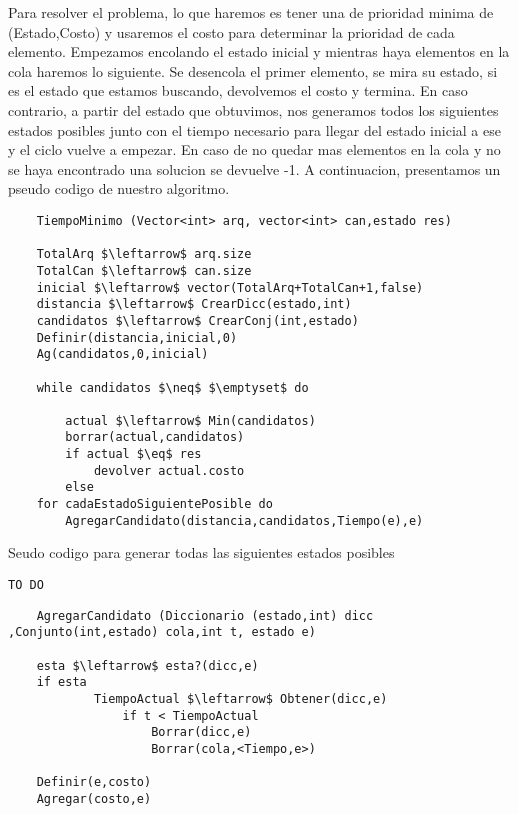 	Para resolver el problema, lo que haremos es tener una de prioridad minima de  (Estado,Costo) y usaremos el costo para determinar la prioridad de cada elemento.
	Empezamos encolando el estado inicial y mientras haya elementos en la cola haremos lo siguiente.
	Se desencola el primer elemento, se mira su estado, si es el estado que estamos buscando, devolvemos el costo y termina.
	En caso contrario, a partir del estado que obtuvimos, nos generamos todos los siguientes estados posibles junto con el tiempo necesario para llegar del estado inicial a ese y el ciclo vuelve a empezar.
	En caso de no quedar mas elementos en la cola y no se haya encontrado una solucion se devuelve -1.
	A continuacion, presentamos un pseudo codigo de nuestro algoritmo.
	

\lstset{basicstyle=\large}
\begin{lstlisting}
	TiempoMinimo (Vector<int> arq, vector<int> can,estado res)

	TotalArq $\leftarrow$ arq.size
	TotalCan $\leftarrow$ can.size
	inicial $\leftarrow$ vector(TotalArq+TotalCan+1,false)
	distancia $\leftarrow$ CrearDicc(estado,int)
	candidatos $\leftarrow$ CrearConj(int,estado)
	Definir(distancia,inicial,0)
	Ag(candidatos,0,inicial)

	while candidatos $\neq$ $\emptyset$ do

		actual $\leftarrow$ Min(candidatos)
		borrar(actual,candidatos)
		if actual $\eq$ res
			devolver actual.costo
		else
	for cadaEstadoSiguientePosible do
		AgregarCandidato(distancia,candidatos,Tiempo(e),e)

\end{lstlisting} 

Seudo codigo para generar todas las siguientes estados posibles
\lstset{basicstyle=\large}

\begin{lstlisting}
TO DO
\end{lstlisting} 

\lstset{basicstyle=\large}
\begin{lstlisting}
	AgregarCandidato (Diccionario (estado,int) dicc ,Conjunto(int,estado) cola,int t, estado e)

	esta $\leftarrow$ esta?(dicc,e)
	if esta
			TiempoActual $\leftarrow$ Obtener(dicc,e)
				if t < TiempoActual
					Borrar(dicc,e)
					Borrar(cola,<Tiempo,e>)
 
	Definir(e,costo)
	Agregar(costo,e)

\end{lstlisting} 

